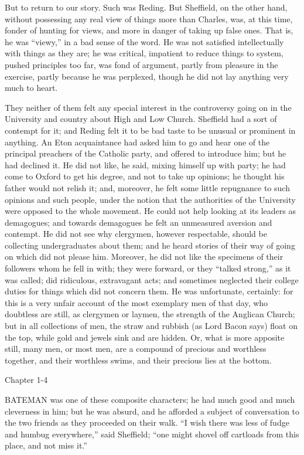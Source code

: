 But to return to our story. Such was Reding. But Sheffield, on the
other hand, without possessing any real view of things more than
Charles, was, at this time, fonder of hunting for views, and more in
danger of taking up false ones. That is, he was ``viewy,'' in
a bad sense of the word. He was not satisfied intellectually with
things as they are; he was critical, impatient to reduce things
to system, pushed principles too far, was fond of argument, partly
from pleasure in the exercise, partly because he was perplexed, though
he did not lay anything very much to heart.

They neither of them felt any special interest in the controversy
going on in the University and country about High and Low Church.
Sheffield had a sort of contempt for it; and Reding felt it to be bad
taste to be unusual or prominent in anything. An Eton acquaintance had
asked him to go and hear one of the principal preachers of the
Catholic party, and offered to introduce him; but he had declined it.
He did not like, he said, mixing himself up with party; he had come to
Oxford to get his degree, and not to take up opinions; he thought his
father would not relish it; and, moreover, he felt some little
repugnance to such opinions and such people, under the notion that the
authorities of the University were opposed to the whole movement. He
could not help looking at its leaders as demagogues; and towards
demagogues he felt an unmeasured aversion and contempt. He did not see
why clergymen, however respectable, should be collecting
undergraduates about them; and he heard stories of their way of going
on which did not please him. Moreover, he did not like the specimens
of their followers whom he fell in with; they were forward, or they
``talked strong,'' as it was called; did ridiculous,
extravagant acts; and sometimes neglected their college duties for
things which did not concern them. He was unfortunate, certainly: for
this is a very unfair account of the most exemplary men of that day,
who doubtless are still, as clergymen or laymen, the strength of
the Anglican Church; but in all collections of men, the straw and
rubbish (as Lord Bacon says) float on the top, while gold and jewels
sink and are hidden. Or, what is more apposite still, many men, or
most men, are a compound of precious and worthless together, and their
worthless swims, and their precious lies at the bottom.

Chapter 1-4


BATEMAN was one of these composite
characters; he had much good and much cleverness in him; but he was
absurd, and he afforded a subject of conversation to the two friends
as they proceeded on their walk. ``I wish there was less of fudge
and humbug everywhere,'' said Sheffield; ``one might shovel
off cartloads from this place, and not miss it.''

